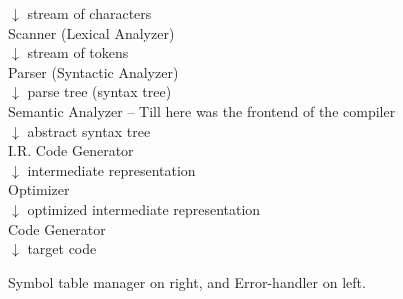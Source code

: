 \documentclass[a4paper]{scrartcl}
\theoremstyle{definition}
\begin{document}
\begin{center}
	$\downarrow$ stream of characters\\
	Scanner (Lexical Analyzer)\\
	$\downarrow$ stream of tokens\\
	Parser (Syntactic Analyzer)\\
	$\downarrow$ parse tree (syntax tree)\\
	Semantic Analyzer -- Till here was the frontend of the compiler\\
	$\downarrow$ abstract syntax tree\\
	I.R. Code Generator\\
	$\downarrow$ intermediate representation\\
	Optimizer\\
	$\downarrow$ optimized intermediate representation\\
	Code Generator\\
	$\downarrow$ target code
\end{center}
Symbol table manager on right, and Error-handler on left.
\end{document}
